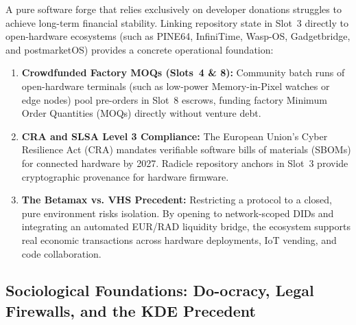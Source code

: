 \documentclass[a4paper,11pt,twoside,parskip=half-,headings=small]{scrartcl}
\begin{document}
A pure software forge that relies exclusively on developer donations struggles to achieve long-term financial stability. Linking repository state in Slot~3 directly to open-hardware ecosystems (such as PINE64, InfiniTime, Wasp-OS, Gadgetbridge, and postmarketOS) provides a concrete operational foundation:
\begin{enumerate}
  \item \textbf{Crowdfunded Factory MOQs (Slots~4 \& 8):} Community batch runs of open-hardware terminals (such as low-power Memory-in-Pixel watches or edge nodes) pool pre-orders in Slot~8 escrows, funding factory Minimum Order Quantities (MOQs) directly without venture debt.
  \item \textbf{CRA and SLSA Level 3 Compliance:} The European Union's Cyber Resilience Act (CRA) mandates verifiable software bills of materials (SBOMs) for connected hardware by 2027. Radicle repository anchors in Slot~3 provide cryptographic provenance for hardware firmware.
  \item \textbf{The Betamax vs. VHS Precedent:} Restricting a protocol to a closed, pure environment risks isolation. By opening to network-scoped DIDs and integrating an automated EUR/RAD liquidity bridge, the ecosystem supports real economic transactions across hardware deployments, IoT vending, and code collaboration.
\end{enumerate}

\subsection{Sociological Foundations: Do-ocracy, Legal Firewalls, and the KDE Precedent}
\label{sec:kde_precedent}
\end{document}
